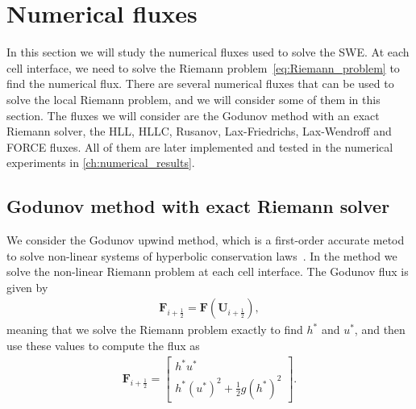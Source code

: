 \section{Numerical fluxes}
In this section we will study the numerical fluxes used to solve the SWE.
At each cell interface, we need to solve the Riemann problem~\eqref{eq:Riemann_problem} to find the numerical flux.
There are several numerical fluxes that can be used to solve the local Riemann problem, and we will consider some of them in this section.
The fluxes we will consider are the Godunov method with an exact Riemann solver, the HLL, HLLC, Rusanov, Lax-Friedrichs, Lax-Wendroff and FORCE fluxes.
All of them are later implemented and tested in the numerical experiments in \autoref{ch:numerical_results}.


\subsection*{Godunov method with exact Riemann solver}
We consider the Godunov upwind method, which is a first-order accurate metod to solve non-linear systems of hyperbolic conservation laws~\cite{Toro2024}.
In the method we solve the non-linear Riemann problem at each cell interface.
The Godunov flux is given by
\begin{align*}
    \mathbf{F}_{i + \frac{1}{2}} = \mathbf{F}(\mathbf{U}_{i + \frac{1}{2}}),
\end{align*}
meaning that we solve the Riemann problem exactly to find $h^*$ and $u^*$, and then use these values to compute the flux as 
\begin{align*}
    \mathbf{F}_{i + \frac{1}{2}} = \begin{bmatrix}
        h^* u^* \\ h^* {(u^{*})}^2 + \frac{1}{2} g {(h^{*})}^2
    \end{bmatrix}.
\end{align*}

